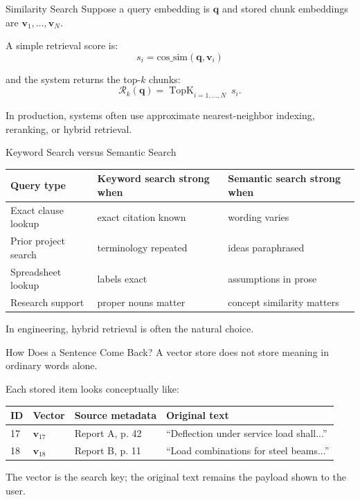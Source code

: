 \documentclass[12pt]{beamer}
\begin{document}
\begin{frame}{Similarity Search}
  Suppose a query embedding is $\mathbf{q}$ and stored chunk embeddings are $\mathbf{v}_1,\dots,\mathbf{v}_N$.

  A simple retrieval score is:
  \[
    s_i = \mathrm{cos\_sim}(\mathbf{q},\mathbf{v}_i)
  \]

  and the system returns the top-$k$ chunks:
  \[
    \mathcal{R}_k(\mathbf{q}) = \operatorname{TopK}_{i=1,\dots,N}\ s_i.
  \]

  In production, systems often use approximate nearest-neighbor indexing, reranking, or hybrid retrieval.
\end{frame}

\begin{frame}{Keyword Search versus Semantic Search}
  \small
  \begin{tabular}{p{} p{} p{}}
    \toprule
    \textbf{Query type} & \textbf{Keyword search strong when} & \textbf{Semantic search strong when} \\
    \midrule
    Exact clause lookup & exact citation known & wording varies \\
    Prior project search & terminology repeated & ideas paraphrased \\
    Spreadsheet lookup & labels exact & assumptions in prose \\
    Research support & proper nouns matter & concept similarity matters \\
    \bottomrule
  \end{tabular}

  In engineering, hybrid retrieval is often the natural choice.
\end{frame}

\begin{frame}{How Does a Sentence Come Back?}
  A vector store does not store meaning in ordinary words alone.

  Each stored item looks conceptually like:
  \begin{tabular}{llll}
    \toprule
    ID & Vector & Source metadata & Original text \\
    \midrule
    17 & $\mathbf{v}_{17}$ & Report A, p.
    42 & ``Deflection under service load shall...'' \\
    18 & $\mathbf{v}_{18}$ & Report B, p.
    11 & ``Load combinations for steel beams...'' \\
    \bottomrule
  \end{tabular}

  The vector is the search key; the original text remains the payload shown to the user.
\end{frame}
\end{document}
